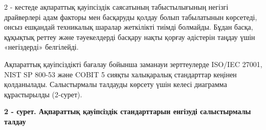 
\begin{multicols}{2}
2 - кестеде ақпараттық қауіпсіздік саясатының табыстылығының негізгі
драйверлері адам факторы мен басқаруды қолдау болып табылатынын
көрсетеді, онсыз ешқандай техникалық шаралар жеткілікті тиімді болмайды.
Бұдан басқа, құқықтық реттеу және тәуекелдерді басқару нақты қорғау
әдістерін таңдау үшін «негіздерді» белгілейді.

Ақпараттық қауіпсіздікті бағалау бойынша заманауи зерттеулерде ISO/IEC
27001, NIST SP 800-53 және COBIT 5 сияқты халықаралық стандарттар
кеңінен қолданылады. Салыстырмалы талдауды көрсету үшін келесі диаграмма
құрастырылды (2-сурет).
\end{multicols}

{\bfseries 2 - сурет. Ақпараттық қауіпсіздік стандарттарын енгізуді
салыстырмалы талдау}

